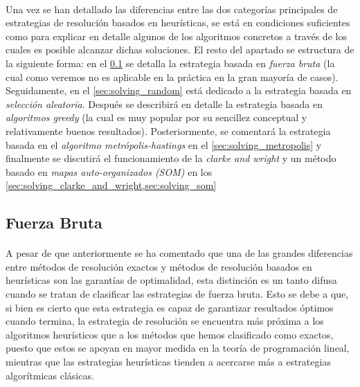 \documentclass{subfiles}
\begin{document}
      \paragraph{}
      Una vez se han detallado las diferencias entre las dos categorías principales de estrategias de resolución basados en heurísticas, se está en condiciones suficientes como para explicar en detalle algunos de los algoritmos concretos a través de los cuales es posible alcanzar dichas soluciones. El resto del apartado se estructura de la siguiente forma: en el \cref{sec:solving_brute_force} se detalla la estrategia basada en \emph{fuerza bruta} (la cual como veremos no es aplicable en la práctica en la gran mayoría de casos). Seguidamente, en el \cref{sec:solving_random} está dedicado a la estrategia basada en \emph{selección aleatoria}. Después se describirá en detalle la estrategia basada en \emph{algoritmos greedy} (la cual es muy popular por su sencillez conceptual y relativamente buenos resultados). Posteriormente, se comentará la estrategia basada en el \emph{algoritmo metrópolis-hastings} en el \cref{sec:solving_metropolis} y finalmente se discutirá el funcionamiento de la \emph{clarke and wright} y un método basado en \emph{mapas auto-organizados (SOM)} en los \cref{sec:solving_clarke_and_wright,sec:solving_som} 

      \subsection{Fuerza Bruta}
      \label{sec:solving_brute_force}
        
        \paragraph{}
        A pesar de que anteriormente se ha comentado que una de las grandes diferencias entre métodos de resolución exactos y métodos de resolución basados en heurísticas son las garantías de optimalidad, esta distinción es un tanto difusa cuando se tratan de clasificar las estrategias de fuerza bruta. Esto se debe a que, si bien es cierto que esta estrategia es capaz de garantizar resultados óptimos cuando termina, la estrategia de resolución se encuentra más próxima a los algoritmos heurísticos que a los métodos que hemos clasificado como exactos, puesto que estos se apoyan en mayor medida en la teoría de programación lineal, mientras que las estrategias heurísticas tienden a acercarse más a estrategias algorítmicas clásicas.
\end{document}

